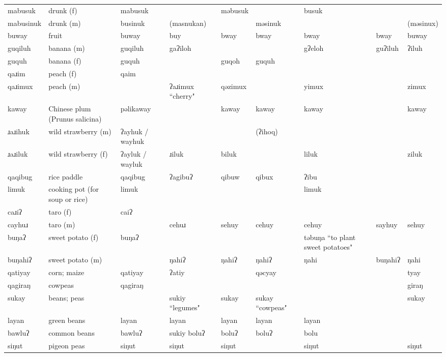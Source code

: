 \begin{landscape}
\begin{longtable}{*{9}{>{\raggedright\arraybackslash}p{}}}
\text{*}mabusuk & drunk (f) & mabusuk &  & məbusuk &  & busuk &  & \\
\text{*}mabusinuk & drunk (m) & businuk & (masnukan) &  & məsinuk &  &  & (məsinux)\\
\text{*}buway & fruit & buway & buy & bway & bway & bway & bway & buway\\
\text{*}guqiluh & banana (m) & guqiluh & gaʔiloh &  &  & gʔeloh & guʔiluh & ʔiluh\\
\text{*}guquh & banana (f) & guquh &  & guqoh & guquh &  &  & \\
\text{*}qaɹim & peach (f) & qaim &  &  &  &  &  & \\
\text{*}qaɹimux & peach (m) &  & ʔaɹimux ``cherry" & qəzimux &  & yimux &  & zimux\\
\text{*}kaway & Chinese plum (Prunus salicina) & pəlikaway &  & kaway & kaway & kaway &  & kaway\\
\text{*}ɹaɹihuk & wild strawberry (m) & ʔayhuk / wayhuk &  &  & (ʔihoq) &  &  & \\
\text{*}ɹaɹiluk & wild strawberry (f) & ʔayluk / wayluk & ɹiluk & biluk &  & liluk &  & ziluk\\
\text{*}qaqibug & rice paddle & qaqibug & ʔagibuʔ & qibuw & qibux & ʔibu &  & \\
\text{*}limuk & cooking pot (for soup or rice) & limuk &  &  &  & limuk &  & \\
\text{*}caɹiʔ & taro (f) & caiʔ &  &  &  &  &  & \\
\text{*}cayhuɹ & taro (m) &  & cehuɹ & sehuy & cehuy & cehuy & sayhuy & sehuy\\
\text{*}buŋaʔ & sweet potato (f) & buŋaʔ &  &  &  & təbuŋa ``to plant sweet potatoes" &  & \\
\text{*}buŋahiʔ & sweet potato (m) &  & ŋahiʔ & ŋahiʔ & ŋahiʔ & ŋahi & buŋahiʔ & ŋahi\\
\text{*}qatiyay & corn; maize & qatiyay & ʔatiy &  & qəcyay &  &  & tyay\\
\text{*}qagiraŋ & cowpeas & qagiraŋ &  &  &  &  &  & giraŋ\\
\text{*}sukay & beans; peas &  & sukiy ``legumes" & sukay & sukay ``cowpeas" &  &  & sukay\\
\text{*}layan & green beans & layan & layan & layan & layan & layan &  & \\
\text{*}bawluʔ & common beans & bawluʔ & sukiy boluʔ & boluʔ & boluʔ & bolu &  & \\
\text{*}siŋut & pigeon peas & siŋut & siŋut & siŋut &  & siŋut &  & siŋut\\

\end{longtable}
\end{landscape}

